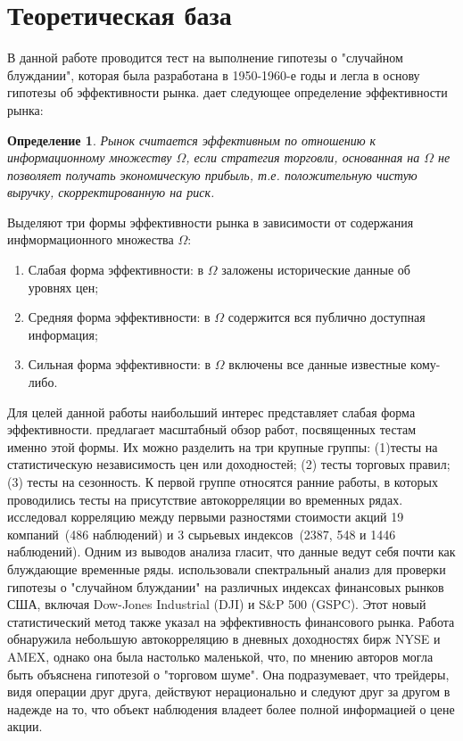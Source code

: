 ﻿\documentclass[a4paper,12pt]{article}
\newtheorem{definition}{Определение}
\begin{document}
\section{Теоретическая база}
В данной работе проводится тест на выполнение гипотезы о "случайном блуждании", которая была разработана в 1950-1960-е годы и легла в основу гипотезы об эффективности рынка. \cite{Jensen1978} дает следующее определение эффективности рынка:
\begin{definition}
  \label{EM}
  Рынок считается эффективным по отношению к информационному множеству $\Omega$, если стратегия торговли, основанная на $\Omega$ не позволяет получать экономическую прибыль, т.е. положительную чистую выручку, скорректированную на риск.
\end{definition}
Выделяют три формы эффективности рынка в зависимости от содержания инфмормационного множества $\Omega$:
\begin{enumerate}
  \item Слабая форма эффективности: в $\Omega$ заложены исторические данные об уровнях цен;
  \item Средняя форма эффективности: в $\Omega$ содержится вся публично доступная информация;
  \item Сильная форма эффективности: в $\Omega$ включены все данные известные кому-либо.
\end{enumerate}
Для целей данной работы наибольший интерес представляет слабая форма эффективности. \cite{Peon2019} предлагает масштабный обзор работ, посвященных тестам именно этой формы. Их можно разделить на три крупные группы: (1)тесты на статистическую независимость цен или доходностей; (2) тесты торговых правил; (3) тесты на сезонность. К первой группе относятся ранние работы, в которых проводились тесты на присутствие автокорреляции во временных рядах. \cite{Kendall1953} исследовал корреляцию между первыми разностями стоимости акций 19 компаний~(486 наблюдений) и 3 сырьевых индексов~(2387, 548 и 1446 наблюдений). Одним из выводов анализа гласит, что данные ведут себя почти как блуждающие временные ряды. \cite{Granger1963} использовали спектральный анализ для проверки гипотезы о "случайном блуждании" на различных индексах финансовых рынков США, включая Dow-Jones Industrial (DJI) и S$\&$P 500 (GSPC). Этот новый статистический метод также указал на эффективность финансового рынка. Работа \cite{French1986} обнаружила небольшую автокорреляцию в дневных доходностях бирж NYSE и AMEX, однако она была настолько маленькой, что, по мнению авторов могла быть объяснена гипотезой о "торговом шуме". Она подразумевает, что трейдеры, видя операции друг друга, действуют нерационально и следуют друг за другом в надежде на то, что объект наблюдения владеет более полной информацией о цене акции. 
\newpage


\end{document}
